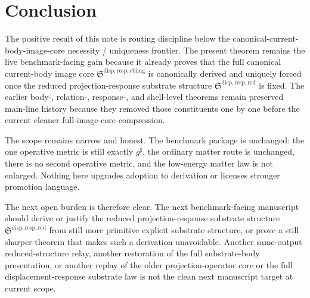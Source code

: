 \documentclass[11pt]{article}
\newcommand{\CompletedMetric}{g^{\sharp}}
\newcommand{\ReducedStructure}{\mathfrak S^{\mathrm{disp,resp,red}}}
\newcommand{\CurrentBodyImageCore}{\mathfrak S^{\mathrm{disp,resp,cbimg}}}
\begin{document}
\section{Conclusion}

The positive result of this note is routing discipline below the canonical-current-body-image-core necessity / uniqueness frontier. The present theorem remains the live benchmark-facing gain because it already proves that the full canonical current-body image core \(\CurrentBodyImageCore\) is canonically derived and uniquely forced once the reduced projection-response substrate structure \(\ReducedStructure\) is fixed. The earlier body-, relation-, response-, and shell-level theorems remain preserved main-line history because they removed those constituents one by one before the current cleaner full-image-core compression.

The scope remains narrow and honest. The benchmark package is unchanged: the one operative metric is still exactly \(\CompletedMetric\), the ordinary matter route is unchanged, there is no second operative metric, and the low-energy matter law is not enlarged. Nothing here upgrades adoption to derivation or licenses stronger promotion language.

The next open burden is therefore clear. The next benchmark-facing manuscript should derive or justify the reduced projection-response substrate structure \(\ReducedStructure\) from still more primitive explicit substrate structure, or prove a still sharper theorem that makes such a derivation unavoidable. Another same-output reduced-structure relay, another restoration of the full substrate-body presentation, or another replay of the older projection-operator core or the full displacement-response substrate law is not the clean next manuscript target at current scope.
\end{document}
